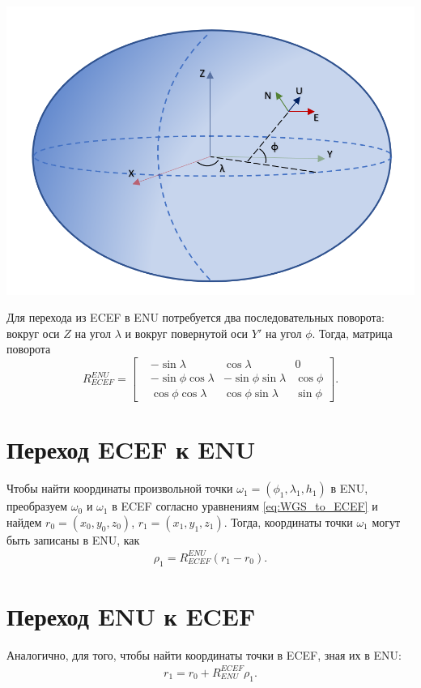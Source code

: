 \documentclass[a4paper,12pt]{article}
\begin{document}
\includegraphics[width=\textwidth]{ecef_enu}

Для перехода из ECEF в ENU потребуется два последовательных поворота:
вокруг оси $Z$ на угол $\lambda$
и вокруг повернутой оси $Y'$ на угол $\phi$.
Тогда, матрица поворота
\begin{equation}
R_{ECEF}^{ENU} = 
\begin{bmatrix} \label{eq:R_ECEF_ENU}
&-\sin \lambda &\cos \lambda &0 \\
&-\sin \phi \cos \lambda &-\sin \phi \sin \lambda &\cos \phi \\
&\cos \phi \cos \lambda &\cos \phi \sin \lambda &\sin \phi 
\end{bmatrix}
.
\end{equation}


\section{Переход ECEF к ENU}
Чтобы найти координаты произвольной точки $\omega_1 = (\phi_1, \lambda_1, h_1)$ в ENU,
преобразуем $\omega_0$ и $\omega_1$ в ECEF согласно уравнениям \eqref{eq:WGS_to_ECEF}
и найдем  $r_0 = (x_0, y_0, z_0)$, $r_1 = (x_1, y_1, z_1)$.
Тогда, координаты точки $\omega_1$ могут быть записаны в ENU, как
\begin{align} 
\rho_1 = R_{ECEF}^{ENU} (r_1 - r_0).
\end{align}

\section{Переход ENU к ECEF}
Аналогично, для того, чтобы найти координаты точки в ECEF, зная их в ENU:
\begin{align} 
r_1 = r_0 + R_{ENU}^{ECEF} \rho_1.
\end{align}
\end{document}

